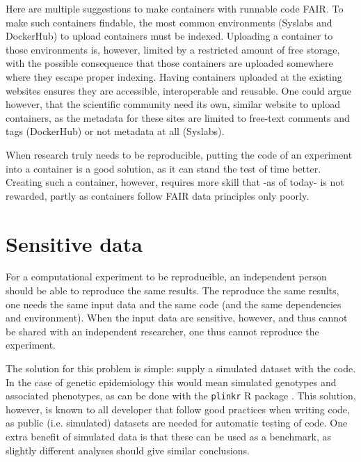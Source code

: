 
Here are multiple suggestions to make containers with runnable code FAIR.
To make such containers findable, the most common 
environments (Syslabs and DockerHub) to upload containers must be indexed.
Uploading a container to those environments is, however, limited by
a restricted amount of free storage, with the possible consequence that
those containers are uploaded somewhere where they escape proper indexing.
Having containers uploaded at the existing websites ensures they are
accessible, interoperable and reusable.
One could argue however, that the scientific community need its own,
similar website to upload containers, as the metadata for these
sites are limited to free-text comments and tags (DockerHub)
or not metadata at all (Syslabs).


When research truly needs to be reproducible, putting the code 
of an experiment into a container is a good solution, as it 
can stand the test of time better.
Creating such a container, however, requires more skill
that -as of today- is not rewarded,
partly as containers follow FAIR data principles only poorly.

\section{Sensitive data}

For a computational experiment to be reproducible,
an independent person should be able to
reproduce the same results.
The reproduce the same results, one needs the same
input data and the same code (and the same 
dependencies and environment).
When the input data are sensitive, however, and thus cannot be shared with
an independent researcher, one thus cannot reproduce the
experiment.

The solution for this problem is simple:
supply a simulated dataset with the code.
In the case of genetic epidemiology this would mean
simulated genotypes and associated phenotypes,
as can be done with the \verb|plinkr| R package \cite{plinkr}.
This solution, however, is known to all developer that follow
good practices when writing code, as public (i.e. simulated) 
datasets are needed for automatic testing of code.
One extra benefit of simulated data is that these can be used
as a benchmark, as slightly different analyses should give 
similar conclusions.

